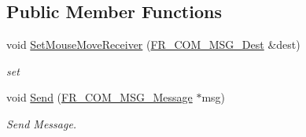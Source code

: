 \subsection*{Public Member Functions}
\begin{DoxyCompactItemize}
\item 
\hypertarget{classPlatform_1_1Input_1_1Input_a6e57061136f709a0533e6c045c5d29ec}{
void \hyperlink{classPlatform_1_1Input_1_1Input_a6e57061136f709a0533e6c045c5d29ec}{SetMouseMoveReceiver} (\hyperlink{structFramework_1_1Communication_1_1Message_1_1Dest}{FR\_\-COM\_\-MSG\_\-Dest} \&dest)}
\label{classPlatform_1_1Input_1_1Input_a6e57061136f709a0533e6c045c5d29ec}

\begin{DoxyCompactList}\small\item\em set \item\end{DoxyCompactList}\item 
\hypertarget{classPlatform_1_1Input_1_1Input_afce3cd8258cde3b4ea52e33367e7bb5d}{
void \hyperlink{classPlatform_1_1Input_1_1Input_afce3cd8258cde3b4ea52e33367e7bb5d}{Send} (\hyperlink{structFramework_1_1Communication_1_1Message_1_1Message}{FR\_\-COM\_\-MSG\_\-Message} $\ast$msg)}
\label{classPlatform_1_1Input_1_1Input_afce3cd8258cde3b4ea52e33367e7bb5d}

\begin{DoxyCompactList}\small\item\em Send Message. \item\end{DoxyCompactList}\end{DoxyCompactItemize}
